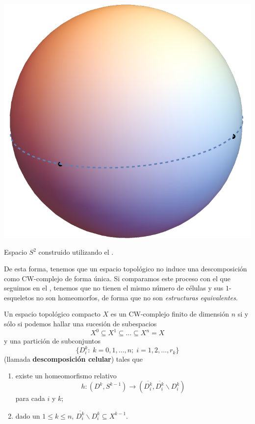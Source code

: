 \begin{marginfigure}
\includegraphics{Figures/S2CW.pdf}
\caption{Espacio $S^2$ construido utilizando el .}
\end{marginfigure}

De esta forma, tenemos que un espacio topológico no induce una descomposición
como CW-complejo de forma única. Si comparamos este proceso con el que
seguimos en el , tenemos que no tienen el mismo número de
células y sus $1$-esqueletos no son homeomorfos, de forma que no son
\textit{estructuras equivalentes}.

\begin{theorem}
Un espacio topológico compacto $X$ es un CW-complejo finito de dimensión $n$
si y sólo si podemos hallar una sucesión de subespacios
\[X^0 \subseteq X^1 \subseteq \dots \subseteq X^n=X\]
y una partición de subconjuntos
\[\{D_i^k:\; k=0,1,\dots,n; \;i=1,2,\dots,r_k\}\]
(llamada \textbf{descomposición celular}) tales que
\begin{enumerate}
\item existe un homeomorfismo relativo
\[h\colon (D^k,S^{k-1}) \to
(\overline{D^k_i},\overline{D^k_i}\backslash D^k_i)\]
para cada $i$ y $k$;
\item dado un $1 \leq k \leq n$, $\overline{D^k_i}\backslash D^k_i
\subseteq X^{k-1}$.
\end{enumerate}
\end{theorem}

